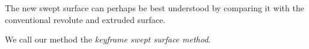 \clearpage

The new swept surface can perhaps be best understood by comparing it
with the conventional revolute and extruded surface.

We call our method the {\em keyframe swept surface method}.




